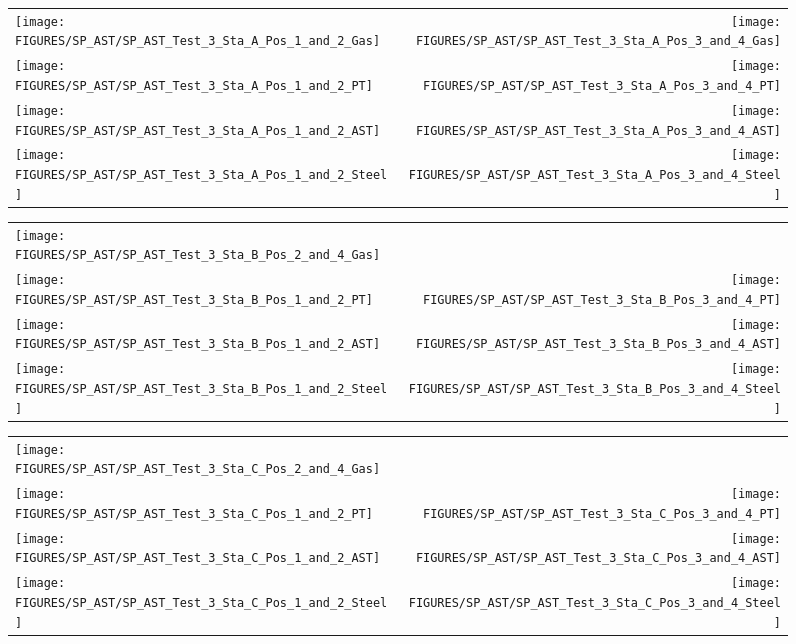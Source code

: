\begin{figure}[p]
\begin{tabular*}{\textwidth}{l@{\extracolsep{\fill}}r}
\texttt{[image: FIGURES/SP\_AST/SP\_AST\_Test\_3\_Sta\_A\_Pos\_1\_and\_2\_Gas]} &
\texttt{[image: FIGURES/SP\_AST/SP\_AST\_Test\_3\_Sta\_A\_Pos\_3\_and\_4\_Gas]} \\
\texttt{[image: FIGURES/SP\_AST/SP\_AST\_Test\_3\_Sta\_A\_Pos\_1\_and\_2\_PT]} &
\texttt{[image: FIGURES/SP\_AST/SP\_AST\_Test\_3\_Sta\_A\_Pos\_3\_and\_4\_PT]} \\
\texttt{[image: FIGURES/SP\_AST/SP\_AST\_Test\_3\_Sta\_A\_Pos\_1\_and\_2\_AST]} &
\texttt{[image: FIGURES/SP\_AST/SP\_AST\_Test\_3\_Sta\_A\_Pos\_3\_and\_4\_AST]} \\
\texttt{[image: FIGURES/SP\_AST/SP\_AST\_Test\_3\_Sta\_A\_Pos\_1\_and\_2\_Steel]} &
\texttt{[image: FIGURES/SP\_AST/SP\_AST\_Test\_3\_Sta\_A\_Pos\_3\_and\_4\_Steel]}
\end{tabular*}
\label{SP_Test_3_Station_A}
\end{figure}

\begin{figure}[p]
\begin{tabular*}{\textwidth}{l@{\extracolsep{\fill}}r}
\texttt{[image: FIGURES/SP\_AST/SP\_AST\_Test\_3\_Sta\_B\_Pos\_2\_and\_4\_Gas]} &
  \\
\texttt{[image: FIGURES/SP\_AST/SP\_AST\_Test\_3\_Sta\_B\_Pos\_1\_and\_2\_PT]} &
\texttt{[image: FIGURES/SP\_AST/SP\_AST\_Test\_3\_Sta\_B\_Pos\_3\_and\_4\_PT]} \\
\texttt{[image: FIGURES/SP\_AST/SP\_AST\_Test\_3\_Sta\_B\_Pos\_1\_and\_2\_AST]} &
\texttt{[image: FIGURES/SP\_AST/SP\_AST\_Test\_3\_Sta\_B\_Pos\_3\_and\_4\_AST]} \\
\texttt{[image: FIGURES/SP\_AST/SP\_AST\_Test\_3\_Sta\_B\_Pos\_1\_and\_2\_Steel]} &
\texttt{[image: FIGURES/SP\_AST/SP\_AST\_Test\_3\_Sta\_B\_Pos\_3\_and\_4\_Steel]}
\end{tabular*}
\label{SP_Test_3_Station_B}
\end{figure}

\begin{figure}[p]
\begin{tabular*}{\textwidth}{l@{\extracolsep{\fill}}r}
\texttt{[image: FIGURES/SP\_AST/SP\_AST\_Test\_3\_Sta\_C\_Pos\_2\_and\_4\_Gas]} &
  \\
\texttt{[image: FIGURES/SP\_AST/SP\_AST\_Test\_3\_Sta\_C\_Pos\_1\_and\_2\_PT]} &
\texttt{[image: FIGURES/SP\_AST/SP\_AST\_Test\_3\_Sta\_C\_Pos\_3\_and\_4\_PT]} \\
\texttt{[image: FIGURES/SP\_AST/SP\_AST\_Test\_3\_Sta\_C\_Pos\_1\_and\_2\_AST]} &
\texttt{[image: FIGURES/SP\_AST/SP\_AST\_Test\_3\_Sta\_C\_Pos\_3\_and\_4\_AST]} \\
\texttt{[image: FIGURES/SP\_AST/SP\_AST\_Test\_3\_Sta\_C\_Pos\_1\_and\_2\_Steel]} &
\texttt{[image: FIGURES/SP\_AST/SP\_AST\_Test\_3\_Sta\_C\_Pos\_3\_and\_4\_Steel]}
\end{tabular*}
\label{SP_Test_3_Station_C}
\end{figure}

